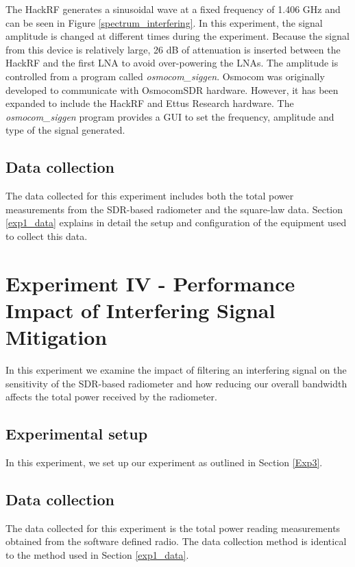 The HackRF generates a sinusoidal wave at a fixed frequency of 1.406 GHz and can be seen in Figure \ref{spectrum_interfering}.  In this experiment, the signal amplitude is changed at different times during the experiment.  Because the signal from this device is relatively large, 26 dB of attenuation is inserted between the HackRF and the first LNA to avoid over-powering the LNAs.  The amplitude is controlled from a program called \emph{osmocom\_siggen}.  Osmocom was originally developed to communicate with OsmocomSDR hardware.  However, it has been expanded to include the HackRF and Ettus Research hardware.  The \emph{osmocom\_siggen} program provides a GUI to set the frequency, amplitude and type of the signal generated.  

\subsection{Data collection}

The data collected for this experiment includes both the total power measurements from the SDR-based radiometer and the square-law data.  Section \ref{exp1_data} explains in detail the setup and configuration of the equipment used to collect this data.

\section{Experiment IV - Performance Impact of Interfering Signal Mitigation}\label{Exp4}

In this experiment we examine the impact of filtering an interfering signal on the sensitivity of the SDR-based radiometer and how reducing our overall bandwidth affects the total power received by the radiometer.

\subsection{Experimental setup} \label{exp4_setup}

In this experiment, we set up our experiment as outlined in Section \ref{Exp3}.

\subsection{Data collection}

The data collected for this experiment is the total power reading measurements obtained from the software defined radio.  The data collection method is identical to the method used in Section \ref{exp1_data}.

